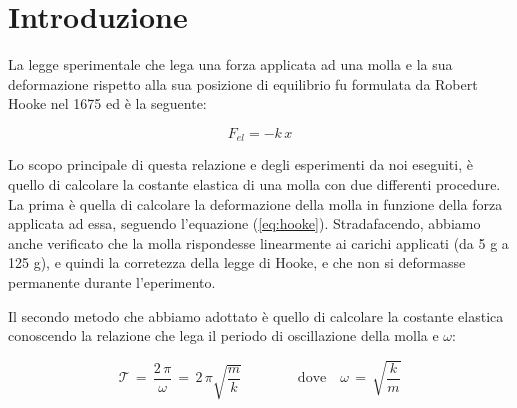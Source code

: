 \section{Introduzione}

La legge sperimentale che lega una forza applicata ad una molla e la sua deformazione rispetto alla sua posizione di equilibrio fu formulata da Robert Hooke nel 1675 ed è la seguente:

\begin{equation}
	F_{el} = -k\,x
	\label{eq:hooke}
\end{equation}

Lo scopo principale di questa relazione e degli esperimenti da noi eseguiti,
è quello di calcolare la costante elastica di una molla con due differenti procedure.
La prima è quella di calcolare la deformazione della molla in funzione della forza applicata ad essa, seguendo l'equazione (\ref{eq:hooke}).
Stradafacendo, abbiamo anche verificato che la molla rispondesse linearmente ai carichi applicati (da 5 g a 125 g),
e quindi la corretezza della legge di Hooke, e che non si deformasse permanente durante l'eperimento.

Il secondo metodo che abbiamo adottato è quello di calcolare la costante elastica conoscendo la relazione
che lega il periodo di oscillazione della molla e $\omega$:

\begin{equation}
	\mathcal{T} \,=\, \frac{2\,\pi}{\omega} \,=\, {2\,\pi}{\sqrt{\frac{m}{k}}} \qquad \qquad \text{dove} \quad  \omega \,=\, \sqrt{\frac{k}{m}}
\end{equation}
